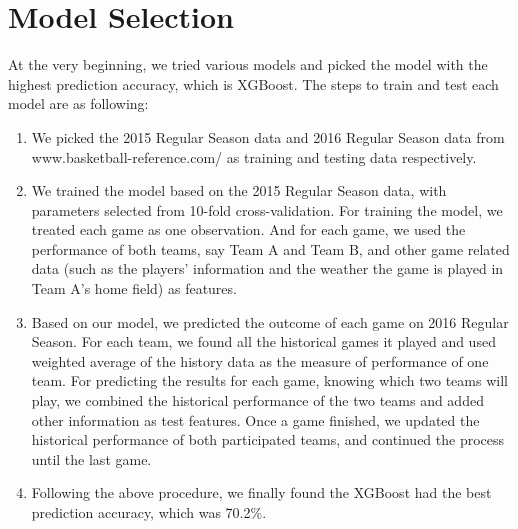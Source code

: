 \section{Model Selection}

At the very beginning, we tried various models and picked the model with 
the highest prediction accuracy, which is XGBoost. The steps to train and test
each model are as following:
\begin{enumerate}
    \item We picked the 2015 Regular Season data and 2016 Regular Season data
    from www.basketball-reference.com/ as training and testing data respectively.

    \item We trained the model based on the 2015 Regular Season data, with 
	    parameters selected from 10-fold cross-validation. For training the
	    model, we treated each game as one observation. And for each game,
	    we used the performance of both teams, say Team A and Team B, and
	    other game related data (such as the players’ information and the
	    weather the game is played in Team A’s home field) as features.
	\item Based on our model, we predicted the outcome of each game on 
	    2016 Regular Season. For each team, we found all the historical games 
	    it played and used weighted average of the history data as the measure
	    of performance of one team. For predicting the results for each game,
	    knowing which two teams will play, we combined the historical performance 
	    of the two teams and added other information as test features. Once a
	    game finished, we updated the historical performance of both
	    participated teams, and continued the process until the last game.
	\item Following the above procedure, we finally found the XGBoost had 
	    the best prediction accuracy, which was 70.2\%.
\end{enumerate}



